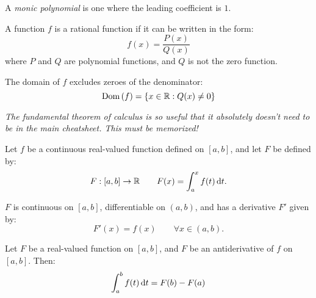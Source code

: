 \begin{multicols}{2}
\begin{CheatsheetEntryFrame}
        A \textit{monic polynomial} is one where the leading coefficient is $1$.

        \CheatsheetEntryExtraSeparation


        A function $f$ is a rational function if it can be written in the form:
        \begin{equation*}
            f(x) = \frac{P(x)}{Q(x)}
        \end{equation*}
        where $P$ and $Q$ are polynomial functions, and $Q$ is not the zero function.

        The domain of $f$ excludes zeroes of the denominator:
        \begin{equation*}
            \dom{(f)} = \braces*{x \in \mathbb{R} : Q(x) \ne 0}
        \end{equation*}

    \end{CheatsheetEntryFrame}

    \MulticolsBreak

    \begin{CheatsheetEntryFrame}

        \textit{The fundamental theorem of calculus is so useful that it absolutely doesn't need to be in the main cheatsheet. This must be memorized!}

        \CheatsheetEntryExtraSeparation

        
        Let $f$ be a continuous real-valued function defined on $[a, b]$, and let $F$ be defined by:
        \begin{equation*}
            F : [a, b] \to \mathbb{R}
                \qquad F(x) = \int_a^x{f(t) \,\diff{t}} .
        \end{equation*}

        $F$ is continuous on $[a, b]$, differentiable on $(a, b)$, and has a derivative $F'$ given by:
        \begin{equation*}
            F'(x) = f(x)
                \qquad \forall x \in (a, b) .
        \end{equation*}


        Let $F$ be a real-valued function on $[a, b]$, and $F$ be an antiderivative of $f$ on $[a, b]$. Then:
        \begin{equation*}
            \int_a^b{f(t) \,\diff{t}} = F(b) - F(a)
        \end{equation*}


    \end{CheatsheetEntryFrame}

\end{multicols}

